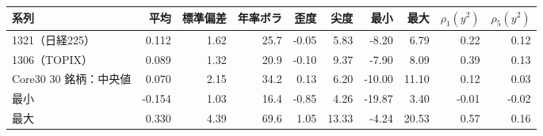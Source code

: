 \begin{tabular}{lrrrrrrrrr}
\toprule
系列 & 平均 & 標準偏差 & 年率ボラ & 歪度 & 尖度 & 最小 & 最大 & $\rho_1(y^2)$ & $\rho_5(y^2)$ \\
\midrule
1321（日経225） & 0.112 & 1.62 & 25.7 & -0.05 & 5.83 & -8.20 & 6.79 & 0.22 & 0.12 \\
1306（TOPIX） & 0.089 & 1.32 & 20.9 & -0.10 & 9.37 & -7.90 & 8.09 & 0.39 & 0.13 \\
\addlinespace
Core30 30 銘柄：中央値 & 0.070 & 2.15 & 34.2 & 0.13 & 6.20 & -10.00 & 11.10 & 0.12 & 0.03 \\
\quad 最小 & -0.154 & 1.03 & 16.4 & -0.85 & 4.26 & -19.87 & 3.40 & -0.01 & -0.02 \\
\quad 最大 & 0.330 & 4.39 & 69.6 & 1.05 & 13.33 & -4.24 & 20.53 & 0.57 & 0.16 \\
\bottomrule
\end{tabular}
